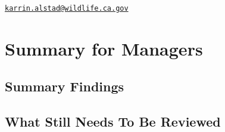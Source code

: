 \documentclass[
]{book}
\begin{document}
\href{mailto:karrin.alstad@wildlife.ca.gov}{\nolinkurl{karrin.alstad@wildlife.ca.gov}}

\hypertarget{summary-for-managers}{%
\chapter*{Summary for Managers}\label{summary-for-managers}}

\hypertarget{summary-findings}{%
\section{Summary Findings}\label{summary-findings}}

\hypertarget{what-still-needs-to-be-reviewed}{%
\section{What Still Needs To Be Reviewed}\label{what-still-needs-to-be-reviewed}}

  
\end{document}
